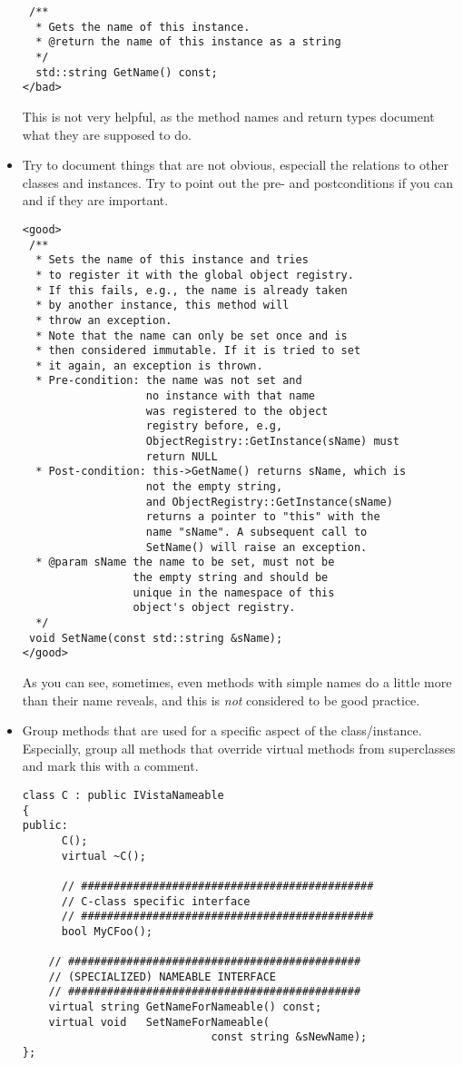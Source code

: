 \begin{itemize}
\begin{verbatim}
 /**
  * Gets the name of this instance.
  * @return the name of this instance as a string
  */
  std::string GetName() const;
</bad>
\end{verbatim}
This is not very helpful, as the method names and return types document what they are supposed to do.
\item Try to document things that are not obvious, especiall the relations to other classes and instances.
Try to point out the pre- and postconditions if you can and if they are important.
\begin{verbatim}
<good>
 /**
  * Sets the name of this instance and tries
  * to register it with the global object registry.
  * If this fails, e.g., the name is already taken
  * by another instance, this method will
  * throw an exception.
  * Note that the name can only be set once and is
  * then considered immutable. If it is tried to set
  * it again, an exception is thrown.
  * Pre-condition: the name was not set and
                   no instance with that name
                   was registered to the object
                   registry before, e.g, 
                   ObjectRegistry::GetInstance(sName) must
                   return NULL
  * Post-condition: this->GetName() returns sName, which is
                   not the empty string,
                   and ObjectRegistry::GetInstance(sName)
                   returns a pointer to "this" with the
                   name "sName". A subsequent call to
                   SetName() will raise an exception.
  * @param sName the name to be set, must not be 
                 the empty string and should be
                 unique in the namespace of this
                 object's object registry.
  */
 void SetName(const std::string &sName);
</good>
\end{verbatim}
As you can see, sometimes, even methods with simple names do a little more than their name reveals, and this is \emph{not} considered to be good practice.
\item Group methods that are used for a specific aspect of the class/instance.
Especially, group all methods that override virtual methods from superclasses and mark this with a comment.
\begin{verbatim}
class C : public IVistaNameable
{
public:
	  C();
	  virtual ~C();
	  
	  // #############################################
	  // C-class specific interface
	  // #############################################	  
	  bool MyCFoo();
	  
    // #############################################
    // (SPECIALIZED) NAMEABLE INTERFACE
    // #############################################
    virtual string GetNameForNameable() const;
    virtual void   SetNameForNameable(
                             const string &sNewName);
};
\end{verbatim}
\end{itemize}


